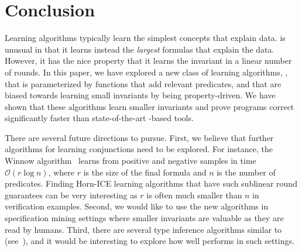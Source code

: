 % 

\section{Conclusion}
\label{sec:conclusion}
Learning algorithms typically learn the simplest concepts that explain data.
\houdini is unusual in that it learns instead the \emph{largest} formulas that explain the data.
However, it has the nice property that it learns the invariant in a linear number of rounds.
In this paper, we have explored a new class of learning algorithms, \sorcar, that is parameterized by functions that add relevant predicates, and that are biased towards learning small invariants by being property-driven.
We have shown that these algorithms learn smaller invariants and prove programs correct significantly faster than state-of-the-art \houdini-based tools.

There are several future directions to pursue. First, we believe that further algorithms for learning conjunctions need to be explored. 
For instance, the Winnow algorithm~\cite{DBLP:journals/ml/Littlestone87} learns from positive and negative samples in time $\mathcal O(r \log n)$, where $r$ is the size of the final formula and $n$ is the number of predicates.
Finding Horn-ICE learning algorithms that have such sublinear round guarantees can be very interesting as $r$ is often much smaller than $n$ in verification examples.
Second, we would like to use the new \sorcar algorithms in specification mining settings where smaller invariants are valuable as they are read by humans.
Third, there are several type inference algorithms similar to \houdini (see~\cite{DBLP:conf/pldi/RondonKJ08}), and it would be interesting to explore how well \sorcar performs in such settings. 
